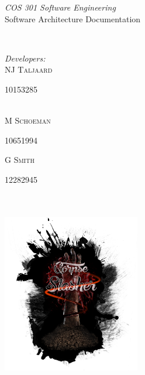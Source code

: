 \documentclass[letterpaper]{article}
\makeatletter
\def\printauthor{%
    {\large \@author}}
\makeatother
\begin{document}
\begin{titlepage}
\begin{center}
\begin{minipage}{0.4\textwidth}
\begin{flushleft} \large
\emph{COS 301 Software Engineering}\\
\vspace{1cm}
Software Architecture Documentation
\end{flushleft}
\end{minipage}
~
\begin{minipage}{0.4\textwidth}
	\begin{flushright} \large
	\emph{Developers:} \\
		NJ \textsc{Taljaard} \\
			\begin{small}
				10153285
			\end{small} \\
		M  \textsc{Schoeman} \\
			\begin{small}
				10651994 \\
			\end{small}
		G  \textsc{Smith} \\
			\begin{small}
				12282945
			\end{small}
	\end{flushright}
\end{minipage}\\



\includegraphics[width=60mm, height=80mm]{corpseslasher.png}\\ %
 
\end{center}
\vfill %

\end{titlepage}
\end{document}

